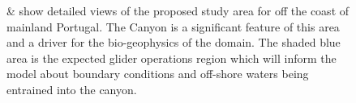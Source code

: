 \begin{figure}[!b]
  \vspace{-0.5cm} 
  \centering 
  \hspace{+0.3cm} 
  \caption{ \&  show detailed
    views of the proposed study area for \proj off the coast of
    mainland Portugal. The \naz Canyon is a significant feature of
    this area and a driver for the bio-geophysics of the domain. The
    shaded blue area is the expected glider operations region which
    will inform the model about boundary conditions and off-shore
    waters being entrained into the canyon.}
  \label{fig:studyarea-1}
\end{figure}

